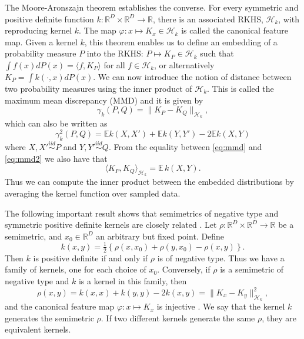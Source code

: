 \documentclass{article}
\def\E{\mathbb{E}}
\begin{document}
The Moore-Aronszajn theorem establishes the converse. For every symmetric
and positive definite function $k: \mathbb{R}^D\times \mathbb{R}^D \to
\mathbb{R}$, there is an associated RKHS, $\mathcal{H}_k$, with reproducing
kernel $k$. The map $\varphi: x \mapsto K_x \in \mathcal{H}_k$ is called
the canonical feature map. Given a kernel $k$,
this theorem enables us to define an embedding of a probability measure
$P$ into the RKHS: $P \mapsto K_P \in
\mathcal{H}_k$ such that 
$\int f(x) d P(x) = \langle f, K_P \rangle$ for all $f \in \mathcal{H}_k$,
or alternatively $K_P = \int k(\cdot, x)  d P(x)$. 
We can now  introduce the 
notion of distance between two probability measures using the inner product
of $\mathcal{H}_k$. This is called the maximum mean discrepancy (MMD) and
it is given by
\begin{equation}\label{eq:mmd}
\gamma_k(P,Q) = \| K_P - K_Q \|_{\mathcal{H}_k},
\end{equation}
which can also be written as \cite{Gretton2012}
\begin{equation}\label{eq:mmd2}
\gamma_k^2(P,Q) = \E k(X,X') + \E k(Y,Y') - 2 \E k(X, Y)
\end{equation}
where $X,X' \stackrel{iid}{\sim} P$ and $Y,Y'\stackrel{iid}{\sim} Q$.
From the equality between \eqref{eq:mmd} and \eqref{eq:mmd2} we also
have that
\begin{equation}\label{eq:inner_data}
\langle K_P, K_Q \rangle_{\mathcal{H}_k} = \E \, k(X, Y).
\end{equation}
Thus we can compute the inner product between the embedded distributions 
by averaging the kernel function over sampled data.

The following important result shows that semimetrics of negative
type and symmetric positive definite kernels are closely related
\cite{Berg1984}. Let $\rho: \mathbb{R}^D \times \mathbb{R}^D \to \mathbb{R}$
be a semimetric, 
and $x_0 \in \mathbb{R}^D$ an arbitrary but fixed point.
Define
\begin{equation}\label{eq:kernel_semimetric}
k(x,y) = \tfrac{1}{2} \left\{  \rho(x,x_0) + \rho(y,x_0) - \rho(x,y)\right\}.
\end{equation}
Then $k$ is positive definite if and only if $\rho$ is of negative type.
Thus we have a family of kernels, one for each choice of $x_0$. Conversely,
if $\rho$ is a semimetric of negative type and $k$ is a kernel in this
family, then 
\begin{equation}\label{eq:gen_kernel}
\rho(x,y) = k(x,x) + k(y,y) -2k(x,y) = \| K_x - K_y
\|^2_{\mathcal{H}_k},
\end{equation}
and the canonical feature map 
$\varphi: x \mapsto K_x$ is injective \cite{Sejdinovic2013}.
We say that the kernel $k$ generates the semimetric $\rho$. 
If two different kernels generate the same $\rho$, they are
equivalent kernels.
\end{document}
